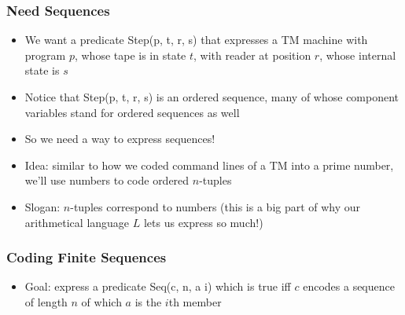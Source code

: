 \begin{frame}
\frametitle{Need Sequences}

\begin{itemize}[<+->]

\item We want a predicate \textrm{Step(p, t, r, s)} that expresses a TM machine with program $p$, whose tape is in state $t$, with reader at position $r$, whose internal state is $s$

\item Notice that \textrm{Step(p, t, r, s)} is an ordered sequence, many of whose component variables stand for ordered sequences as well

\item So we need a way to express sequences! 

\item Idea: similar to how we coded command lines of a TM into a prime number, we'll use numbers to code ordered $n$-tuples

\item Slogan: $n$-tuples correspond to numbers (this is a big part of why our arithmetical language $L$ lets us express so much!)


\end{itemize}
\end{frame}

\begin{frame}
\frametitle{Coding Finite Sequences}

\begin{itemize}[<+->]

\item Goal: express a predicate \textrm{Seq(c, n, a i)} which is true iff $c$ encodes a sequence of length $n$ of which $a$ is the $i$th member

\end{itemize}
\end{frame}

\fi 


\iffalse

